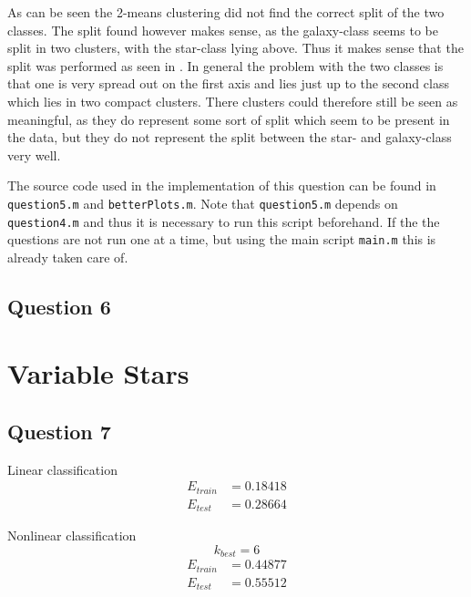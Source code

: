 \documentclass[a4paper, 11pt]{article}
\begin{document}
As can be seen the 2-means clustering did not find the correct split of the two classes. The split found however makes sense, as the galaxy-class seems to be split in two clusters, with the star-class lying above. Thus it makes sense that the split was performed as seen in . In general the problem with the two classes is that one is very spread out on the first axis and lies just up to the second class which lies in two compact clusters. There clusters could therefore still be seen as meaningful, as they do represent some sort of split which seem to be present in the data, but they do not represent the split between the star- and galaxy-class very well.


The source code used in the implementation of this question can be found in \texttt{question5.m} and \texttt{betterPlots.m}. Note that \texttt{question5.m} depends on \texttt{question4.m} and thus it is necessary to run this script beforehand. If the the questions are not run one at a time, but using the main script \texttt{main.m} this is already taken care of.

\subsection*{Question 6} %


\section{Variable Stars} %
\label{sec:variable_stars}

\subsection*{Question 7} %

Linear classification
\begin{align*}
    E_{\mathit{train}} &= 0.18418 \\
    E_{\mathit{test}} &= 0.28664
\end{align*}

Nonlinear classification
\[
    k_{\mathit{best}} = 6
\]
\begin{align*}
    E_{\mathit{train}} &= 0.44877 \\
    E_{\mathit{test}} &= 0.55512
\end{align*}
\end{document}
